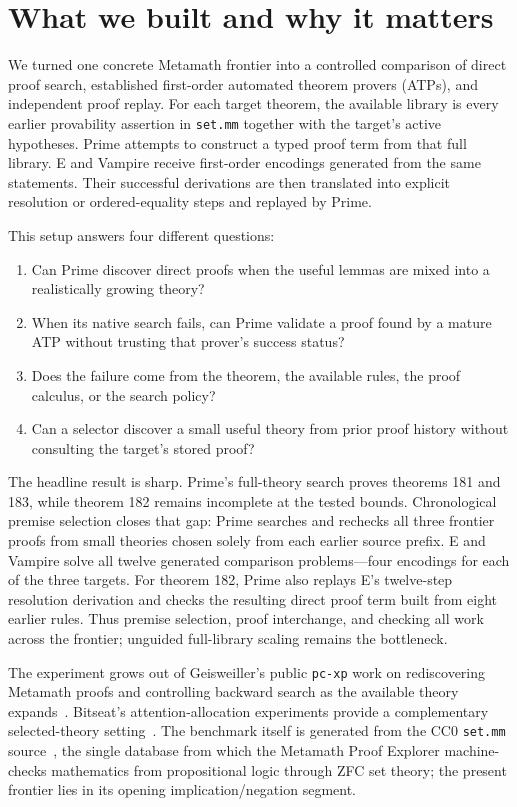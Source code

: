 \documentclass[10pt]{article}
\newcommand{\pcxp}{\texttt{pc-xp}}
\begin{document}
\section{What we built and why it matters}

We turned one concrete Metamath frontier into a controlled comparison of
direct proof search, established first-order automated theorem provers (ATPs),
and independent proof replay.  For each target theorem, the available library
is every earlier
provability assertion in \texttt{set.mm} together with the target's active
hypotheses.  Prime attempts to construct a typed proof term from that full
library.  E and Vampire receive first-order encodings generated from the same
statements.  Their successful derivations are then translated into explicit
resolution or ordered-equality steps and replayed by Prime.

This setup answers four different questions:

\begin{enumerate}
\item Can Prime discover direct proofs when the useful lemmas are mixed into a
  realistically growing theory?
\item When its native search fails, can Prime validate a proof found by a
  mature ATP without trusting that prover's success status?
\item Does the failure come from the theorem, the available rules, the proof
  calculus, or the search policy?
\item Can a selector discover a small useful theory from prior proof history
  without consulting the target's stored proof?
\end{enumerate}

The headline result is sharp.  Prime's full-theory search proves
theorems 181 and 183, while theorem 182 remains incomplete at the tested
bounds.  Chronological premise selection closes that gap: Prime searches and
rechecks all three frontier proofs from small theories chosen solely from each
earlier source prefix.  E and Vampire solve all twelve generated comparison
problems---four encodings for each of the three targets.  For theorem 182,
Prime also replays E's twelve-step resolution derivation and checks the
resulting direct proof term built from eight earlier rules.  Thus premise
selection, proof interchange, and checking all work across the frontier;
unguided full-library scaling remains the bottleneck.

The experiment grows out of Geisweiller's public \pcxp{} work on rediscovering
Metamath proofs and controlling backward search as the available theory
expands~\cite{geisweiller-chaining,geisweiller-ic,backward-via-forward}.
Bitseat's attention-allocation experiments provide a complementary
selected-theory setting~\cite{bitseat-aa}.  The benchmark itself is generated
from the CC0 \texttt{set.mm} source~\cite{setmm}, the single database from
which the Metamath Proof Explorer machine-checks mathematics from
propositional logic through ZFC set theory; the present frontier lies in its
opening implication/negation segment.
\end{document}
